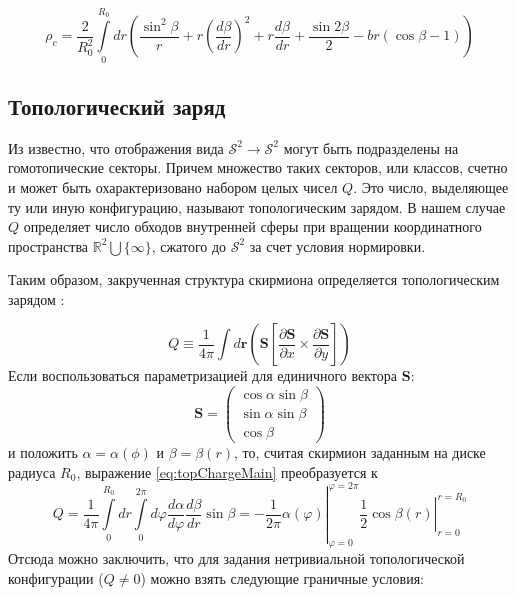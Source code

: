 \documentclass[a4paper,article,14pt]{extarticle}
\begin{document}
\begin{equation}
\label{eq:density}
{\rho _c} = \frac{2}{{R_0^2}}\int\limits_0^{{R_0}} {dr\left( {\frac{{{{\sin }^2}\beta }}{r} + r{{\left( {\frac{{d\beta }}{{dr}}} \right)}^2} + r\frac{{d\beta }}{{dr}} + \frac{{\sin 2\beta }}{2} - br\left( {\cos \beta  - 1} \right)} \right)}
\end{equation}

\subsection{Топологический заряд}

Из \cite{book:rajaraman} известно, что отображения вида $\mathcal{S}^2 \rightarrow \mathcal{S}^2$ могут быть подразделены на гомотопические секторы. Причем множество таких секторов, или классов, счетно и может быть охарактеризовано набором целых чисел $Q$. Это число, выделяющее ту или иную конфигурацию, называют топологическим зарядом. В нашем случае $Q$ определяет число обходов внутренней сферы при вращении координатного пространства $\mathbb{R}^2 \bigcup \{\infty\}$, сжатого до $\mathcal{S}^2$ за счет условия нормировки.

Таким образом, закрученная структура скирмиона определяется топологическим зарядом \cite{rajaraman}:

\begin{equation}
\label{eq:topChargeMain}
Q \equiv \frac{1}{{4\pi }}\int {d{\mathbf{r}}\left( {{\mathbf{S}}\left[ {\frac{{\partial {\mathbf{S}}}}{{\partial x}} \times \frac{{\partial {\mathbf{S}}}}{{\partial y}}} \right]} \right)}
\end{equation}
Если воспользоваться параметризацией для единичного вектора $\mathbf{S}$:
\begin{equation}
\label{eq:parametr}
\mathbf{S} = \left( {\begin{array}{*{20}{c}}
{\cos \alpha \sin \beta }\\
{\sin \alpha \sin \beta }\\
{\cos \beta }
\end{array}} \right)
\end{equation}
и положить $\alpha = \alpha(\phi)$ и $\beta = \beta (r)$, то, считая скирмион заданным на диске радиуса $R_0$,  выражение \eqref{eq:topChargeMain} преобразуется к
\begin{equation}
\label{eq:topChargeSimplify}
\left. {Q = \frac{1}{{4\pi }}\int\limits_0^{{R_0}} {dr\int\limits_0^{2\pi } {d\varphi } } \frac{{d\alpha }}{{d\varphi }}\frac{{d\beta }}{{dr}}\sin \beta  =  - \frac{1}{{2\pi }}\alpha \left( \varphi  \right)} \right|_{\varphi  = 0}^{\varphi  = 2\pi }\left. {\frac{1}{2}\cos \beta \left( r \right)} \right|_{r = 0}^{r = {R_0}}
\end{equation}
Отсюда можно заключить, что для задания нетривиальной топологической конфигурации ($Q \neq0$) можно взять следующие граничные условия:
\end{document}
